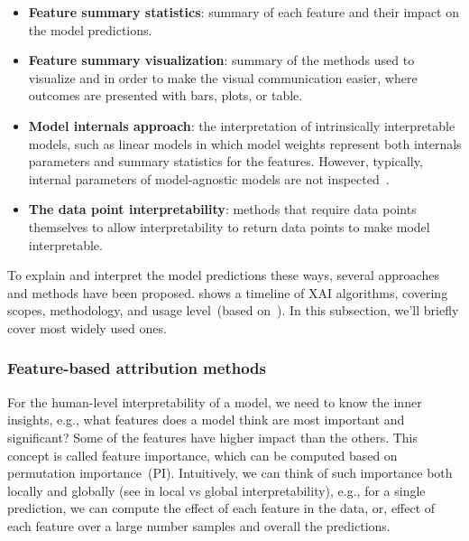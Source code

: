 \vspace{-2mm}
\begin{itemize}[noitemsep]
    \item \textbf{Feature summary statistics}: summary of each feature and their impact on the model predictions. 
    \item \textbf{Feature summary visualization}:  summary of the methods used to visualize and in order to make the visual communication easier, where outcomes are  presented with bars, plots, or table. 
    \item \textbf{Model internals approach}: the interpretation of intrinsically interpretable models, such as linear models in which model weights represent both internals parameters and summary statistics for the features. However, typically, internal parameters of model-agnostic models are not inspected~\cite{molnar2019interpretable}. 
    \item \textbf{The data point interpretability}: methods that require data points themselves to allow interpretability to  return data points to make model interpretable. 
\end{itemize}

\hspace*{3.5mm} To explain and interpret the model predictions these ways, several approaches and methods have been proposed. 
 shows a timeline of XAI algorithms, covering scopes, methodology, and usage level~(based on~\cite{das2020opportunities}). In this subsection, we'll briefly cover most widely used ones. 

\subsubsection{Feature-based attribution methods}
\label{subsubsec:FI_shap}
For the human-level interpretability of a model, we need to know the inner insights, e.g., what features does a model think are most important and significant? Some of the features have higher impact than the others. This concept is called feature importance, which can be computed based on permutation importance~(PI). Intuitively, we can think of such importance both locally and globally (see in local vs global interpretability), e.g., for a single prediction, we can compute the effect of each feature in the data, or, effect of each feature over a large number samples and overall the predictions.

